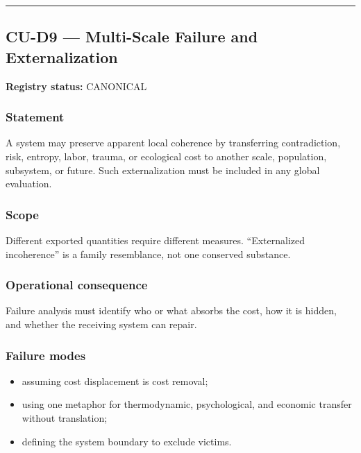 \documentclass[
  11pt,
]{article}
\providecommand{\tightlist}{%
  \setlength{\itemsep}{0pt}\setlength{\parskip}{0pt}}
\begin{document}
\begin{center}\rule{0.5\linewidth}{0.5pt}\end{center}

\subsection{CU-D9 --- Multi-Scale Failure and
Externalization}\label{cu-d9-multi-scale-failure-and-externalization}

\textbf{Registry status:} CANONICAL

\subsubsection{Statement}\label{statement-49}

A system may preserve apparent local coherence by transferring
contradiction, risk, entropy, labor, trauma, or ecological cost to
another scale, population, subsystem, or future. Such externalization
must be included in any global evaluation.

\subsubsection{Scope}\label{scope-23}

Different exported quantities require different measures. ``Externalized
incoherence'' is a family resemblance, not one conserved substance.

\subsubsection{Operational
consequence}\label{operational-consequence-31}

Failure analysis must identify who or what absorbs the cost, how it is
hidden, and whether the receiving system can repair.

\subsubsection{Failure modes}\label{failure-modes-22}

\begin{itemize}
\tightlist
\item
  assuming cost displacement is cost removal;
\item
  using one metaphor for thermodynamic, psychological, and economic
  transfer without translation;
\item
  defining the system boundary to exclude victims.
\end{itemize}
\end{document}
